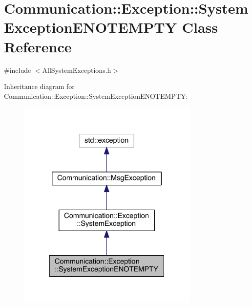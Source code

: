 \hypertarget{class_communication_1_1_exception_1_1_system_exception_e_n_o_t_e_m_p_t_y}{}\section{Communication\+:\+:Exception\+:\+:System\+Exception\+E\+N\+O\+T\+E\+M\+P\+T\+Y Class Reference}
\label{class_communication_1_1_exception_1_1_system_exception_e_n_o_t_e_m_p_t_y}


{\ttfamily \#include $<$All\+System\+Exceptions.\+h$>$}



Inheritance diagram for Communication\+:\+:Exception\+:\+:System\+Exception\+E\+N\+O\+T\+E\+M\+P\+T\+Y\+:\nopagebreak
\begin{figure}[H]
\begin{center}
\leavevmode
\includegraphics[width=256pt]{class_communication_1_1_exception_1_1_system_exception_e_n_o_t_e_m_p_t_y__inherit__graph}
\end{center}
\end{figure}


